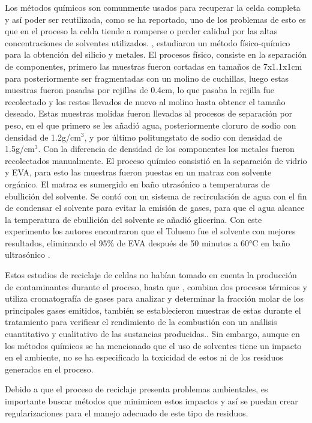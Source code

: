 Los métodos químicos son comunmente usados para recuperar la celda completa y así poder ser reutilizada, como se ha reportado, uno de los problemas de esto es que en el proceso la celda tiende a romperse o perder calidad por las altas concentraciones de solventes utilizados. \citet{Azeumo2019}, estudiaron un método físico-químico para la obtención del silicio y metales. El procesos físico, consiste en la separación de componentes, primero las muestras fueron cortadas en tamaños de 7x1.1x1cm para posteriormente ser fragmentadas con un molino de cuchillas, luego estas muestras fueron pasadas por rejillas de 0.4cm, lo que pasaba la rejilla fue recolectado y los restos llevados de nuevo al molino hasta obtener el tamaño deseado. Estas muestras molidas fueron llevadas al procesos de separación por peso, en el que primero se les añadió agua, posteriormente cloruro de sodio con densidad de 1.2g/cm$^{3}$, y por último politungstato de sodio con densidad de 1.5g/cm$^{3}$. Con la diferencia de densidad de los componentes los metales fueron recolectados manualmente. El proceso químico consistió en la separación de vidrio y EVA, para esto las muestras fueron puestas en un matraz con solvente orgánico. El matraz es sumergido en baño utrasónico a temperaturas de ebullición del solvente. Se contó con un sistema de recirculación de agua con el fin de condensar el solvente para evitar la emisión de gases, para que el agua alcance la temperatura de ebullición del solvente se añadió glicerina. Con este experimento los autores encontraron que el Tolueno fue el solvente con mejores resultados, eliminando el 95\% de EVA después de 50 minutos a 60°C en baño ultrasónico \citep{Azeumo2019}.  

 Estos estudios de reciclaje de celdas no habían tomado en cuenta la producción de contaminantes durante el proceso, hasta que \citet{Fiandra2019}, combina dos procesos térmicos y utiliza cromatografía de gases para analizar y determinar la fracción molar de los principales gases emitidos, también se establecieron muestras de estas durante el tratamiento para verificar el rendimiento de la combustión con un análisis cuantitativo y cualitativo de las sustancias producidas.\citep{Fiandra2019}. Sin embargo, aunque en los métodos químicos se ha mencionado que el uso de solventes tiene un impacto en el ambiente, no se ha especificado la toxicidad de estos ni de los residuos generados en el proceso.

Debido a que el proceso de reciclaje presenta problemas ambientales, es importante buscar métodos que minimicen estos impactos y así se puedan crear regularizaciones para el manejo adecuado de este tipo de residuos. 

